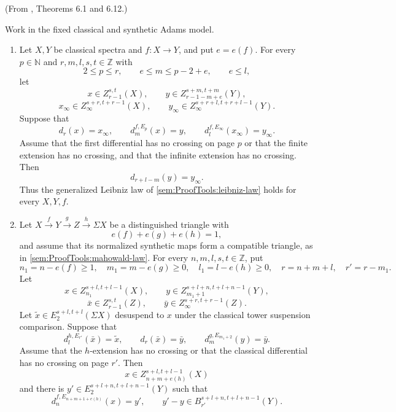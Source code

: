 \begin{theorem}
\label{frontier:ProofTools:003e9deb7ec5}
(From \cite{LWX126}, Theorems 6.1 and 6.12.)\par
Work in the fixed classical and synthetic Adams model.
\begin{enumerate}
\item Let $X,Y$ be classical spectra and $f:X\to Y$, and put $e=e(f)$. For every $p\in\mathbb N$ and $r,m,l,s,t\in\mathbb Z$ with
\[2\leq p\leq r,\qquad e\leq m\leq p-2+e,\qquad e\leq l,\]
let
\[x\in Z_{r-1}^{s,t}(X),\qquad y\in Z_{r-1-m+e}^{s+m,t+m}(Y),\]
\[x_\infty\in Z_\infty^{s+r,t+r-1}(X),\qquad y_\infty\in Z_\infty^{s+r+l,t+r+l-1}(Y).
\]
Suppose that
\[d_r(x)=x_\infty,\qquad d_m^{f,E_p}(x)=y,\qquad d_l^{f,E_\infty}(x_\infty)=y_\infty.
\]
Assume that the first differential has no crossing on page $p$ or that the finite extension has no crossing, and that the infinite extension has no crossing. Then
\[d_{r+l-m}(y)=y_\infty.
\]
Thus the generalized Leibniz law of \ref{sem:ProofTools:leibniz-law} holds for every $X,Y,f$.

\item Let $X\xrightarrow fY\xrightarrow gZ\xrightarrow h\Sigma X$ be a distinguished triangle with
\[e(f)+e(g)+e(h)=1,
\]
and assume that its normalized synthetic maps form a compatible triangle, as in \ref{sem:ProofTools:mahowald-law}. For every $n,m,l,s,t\in\mathbb Z$, put
\[n_1=n-e(f)\geq1,\quad m_1=m-e(g)\geq0,\quad l_1=l-e(h)\geq0,\quad r=n+m+l,\quad r'=r-m_1.
\]
Let
\[x\in Z_{n_1}^{s+l,t+l-1}(X),\qquad y\in Z_{m_1+1}^{s+l+n,t+l+n-1}(Y),\]
\[\bar x\in Z_{r-1}^{s,t}(Z),\qquad\bar y\in Z_\infty^{s+r,t+r-1}(Z).
\]
Let $\widetilde x\in E_2^{s+l,t+l}(\Sigma X)$ desuspend to $x$ under the classical tower suspension comparison. Suppose that
\[d_l^{h,E_{r'}}(\bar x)=\widetilde x,\qquad d_r(\bar x)=\bar y,\qquad d_m^{g,E_{m_1+2}}(y)=\bar y.
\]
Assume that the $h$-extension has no crossing or that the classical differential has no crossing on page $r'$. Then
\[x\in Z_{n+m+e(h)}^{s+l,t+l-1}(X)
\]
and there is $y'\in E_2^{s+l+n,t+l+n-1}(Y)$ such that
\[d_n^{f,E_{n+m+1+e(h)}}(x)=y',\qquad y'-y\in B_{r'}^{s+l+n,t+l+n-1}(Y).
\]
\end{enumerate}
\end{theorem}
